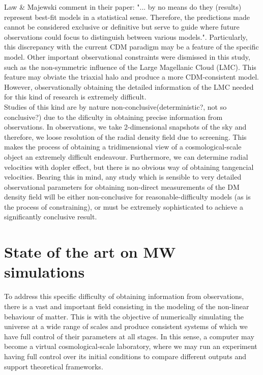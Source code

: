 Law \& Majewski comment in their paper: "... by no means do they (results) represent best-fit models in a statistical sense. Therefore, the predictions made cannot be considered exclusive or definitive but serve to guide where future observations could focus to distinguish between various models.". 
Particularly, this discrepancy with the current CDM paradigm may be a feature of the specific model. 
Other important observational constraints were dismissed in this study, such as the non-symmetric influence of the Large Magellanic Cloud (LMC). 
This feature may obviate the triaxial halo and produce a more CDM-consistent model. 
However, observationally obtaining the detailed information of the LMC needed for this kind of research is extremely difficult.\\

Studies of this kind are by nature non-conclusive(deterministic?, not so conclusive?) due to the dificulty in obtaining precise information from observations. 
In observations, we take 2-dimensional snapshots of the sky and therefore, we loose resolution of the radial density field due to screening. 
This makes the process of obtaining  a tridimensional view of a cosmological-scale object an extremely difficult endeavour. 
Furthermore, we can determine radial velocities with dopler effect, but there is no obvious way of obtaining tangencial velocities. 
Bearing this in mind, any study which is sensible to very detailed observational parameters for obtaining non-direct measurements of the DM density field will be either non-conclusive for reasonable-difficulty models (as is the process of constraining), or must be extremely sophisticated to achieve a significantly conclusive result.\\

\section{State of the art on MW simulations}
To address this specific difficulty of obtaining information from observations, there is a vast and important field consisting in the modeling of the non-linear behaviour of matter. 
This is with the objective of numerically simulating the universe at a wide range of scales and produce consistent systems of which we have full control of their parameters at all stages. 
In this sense, a computer may become a virtual cosmological-scale laboratory, where we may run an experiment having full control over its initial conditions to compare different outputs and support theoretical frameworks. \\


